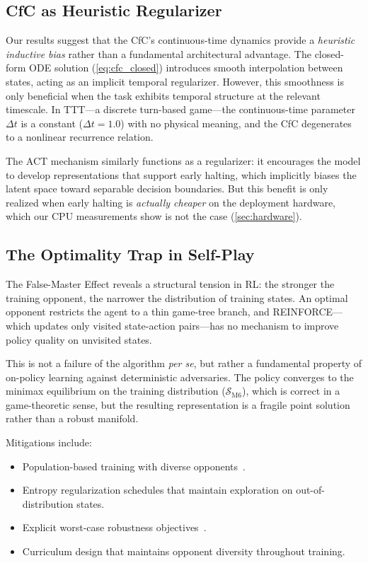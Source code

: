 \documentclass[conference]{IEEEtran}
\begin{document}
\subsection{CfC as Heuristic Regularizer}
\label{ssec:regularizer}

Our results suggest that the CfC's continuous-time dynamics provide a \emph{heuristic inductive bias} rather than a fundamental architectural advantage. The closed-form ODE solution (\cref{eq:cfc_closed}) introduces smooth interpolation between states, acting as an implicit temporal regularizer. However, this smoothness is only beneficial when the task exhibits temporal structure at the relevant timescale. In TTT---a discrete turn-based game---the continuous-time parameter $\Delta t$ is a constant ($\Delta t = 1.0$) with no physical meaning, and the CfC degenerates to a nonlinear recurrence relation.

The ACT mechanism similarly functions as a regularizer: it encourages the model to develop representations that support early halting, which implicitly biases the latent space toward separable decision boundaries. But this benefit is only realized when early halting is \emph{actually cheaper} on the deployment hardware, which our CPU measurements show is not the case (\cref{sec:hardware}).

\subsection{The Optimality Trap in Self-Play}
\label{ssec:optimality_trap}

The False-Master Effect reveals a structural tension in RL: the stronger the training opponent, the narrower the distribution of training states. An optimal opponent restricts the agent to a thin game-tree branch, and REINFORCE---which updates only visited state-action pairs---has no mechanism to improve policy quality on unvisited states.

This is not a failure of the algorithm \textit{per se}, but rather a fundamental property of on-policy learning against deterministic adversaries. The policy converges to the minimax equilibrium on the training distribution ($\mathcal{S}_{\text{M6}}$), which is correct in a game-theoretic sense, but the resulting representation is a fragile point solution rather than a robust manifold.

Mitigations include:
\begin{itemize}
    \item Population-based training with diverse opponents~\cite{jaderberg2019human}.
    \item Entropy regularization schedules that maintain exploration on out-of-distribution states.
    \item Explicit worst-case robustness objectives~\cite{pinto2017robust}.
    \item Curriculum design that maintains opponent diversity throughout training.
\end{itemize}
\end{document}
